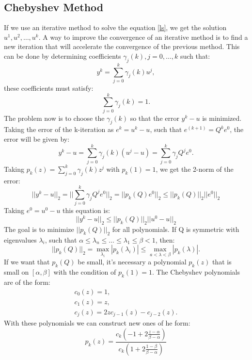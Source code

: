 \documentclass[12pt]{report}
\begin{document}
\subsection{Chebyshev Method}
If we use an iterative method to solve  the equation \eqref{ls}, we get the solution $u^1, u^2, \dots, u^k$. A way to improve the convergence of an iterative method
is to find a new iteration that will accelerate the convergence of the previous method. This can be done by determining coefficients
$\gamma_{j}(k), j=0,\dots,k$ such that:
$$y^k=\sum_{j=0}^k \gamma_{j}(k) u^j,$$
these coefficients must satisfy: $$\sum_{j=0}^k \gamma_{j}(k)=1.$$
The problem now is to choose the $\gamma_j(k)$ so that the error $y^k-u$ is minimized.
Taking the error of the k-iteration as $e^k=u^k-u$, such that $e^{(k+1)}=Q^ke^0$, the error will be given by:
\begin{equation*}
y^k-u=\sum_{j=0}^k \gamma_j(k)(u^j-u)=\sum_{j=0}^k\gamma_jQ^je^0.
\end{equation*}
Taking $p_k(z)=\sum_{j=0}^k\gamma_j(k)z^j$ with $p_k(1)=1$, we get the 2-norm of the error:
\begin{equation*}
 ||y^k-u||_2=||\sum_{j=0}^k\gamma_jQ^je^0||_2=||p_k(Q)e^0||_2 \leq||p_k(Q)||_2||e^0||_2
\end{equation*}
Taking $e^0=u^0-u$ this equation is:
\begin{equation*}
 ||y^k-u||_2\leq ||p_k(Q)||_2||u^0-u||_2
\end{equation*}
The goal is to minimize $||p_k(Q)||_2$ for all polynomials. If Q is symmetric with eigenvalues $\lambda_i$, such that
$\alpha \leq \lambda_n \leq \dots \leq \lambda_1 \leq \beta <1$, then:
\begin{equation*}
||p_k(Q)||_2=\max_{\lambda_i}|p_k(\lambda_i)| \leq \max_{a<\lambda<\beta}|p_k(\lambda)|.
\end{equation*}
If we want that $p_k(Q)$ be small, it's necessary a polynomial $p_k(z)$ that is small on $[\alpha,\beta]$ with the condition of $p_k(1)=1$.
The Chebyshev polynomials are of the form:
\begin{gather*}
 c_0(z)=1,\\
 c_1(z)=z,\\
 c_j(z)=2zc_{j-1}(z)-c_{j-2}(z).
\end{gather*}
With these polynomials we can construct new ones of he form:
\begin{equation}
 p_k(z)=\frac{c_k(-1+2\frac{z-\alpha}{\beta-\alpha})}{c_k(1+2\frac{1-\beta}{\beta-\alpha})}
\end{equation}
\end{document}
